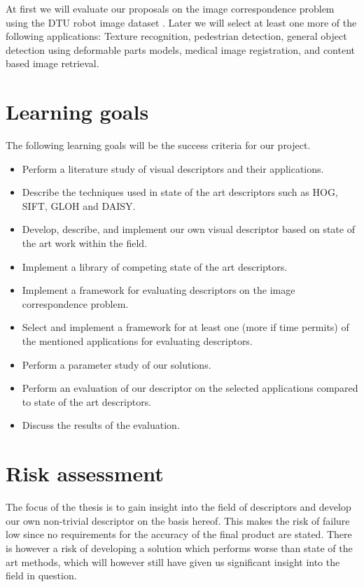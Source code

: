 \documentclass[11pt,a4paper]{article}
\begin{document}
At first we will evaluate our
proposals on the image correspondence problem using the DTU robot image
dataset \cite{aanaes2012interesting}. Later we will select at least
one more of the following applications: Texture recognition, pedestrian
detection, general object detection using deformable parts models, medical
image registration, and content based image retrieval.

\section{Learning goals}
The following learning goals will be the success criteria for our
project.
\begin{itemize}
    \item Perform a literature study of visual descriptors and their
        applications.
    \item Describe the techniques used in state of the art descriptors such as
        HOG, SIFT, GLOH and DAISY.
    \item Develop, describe, and implement our own visual descriptor based on
        state of the art work within the field.
    \item Implement a library of competing state of the art descriptors.
    \item Implement a framework for evaluating descriptors on the image
        correspondence problem.
    \item Select and implement a framework for at least one (more if time
        permits) of the mentioned applications for evaluating descriptors.
    \item Perform a parameter study of our solutions.
    \item Perform an evaluation of our descriptor on the selected
        applications compared to state of the art descriptors.
    \item Discuss the results of the evaluation.
\end{itemize}

\section{Risk assessment}
The focus of the thesis is to gain insight into the field of descriptors and
develop our own non-trivial descriptor on the basis hereof. This makes the risk
of failure low since no requirements for the accuracy of the final product are
stated. There is however a risk of developing a solution which performs worse
than state of the art methods, which will however still have given us
significant insight into the field in question.
\end{document}

